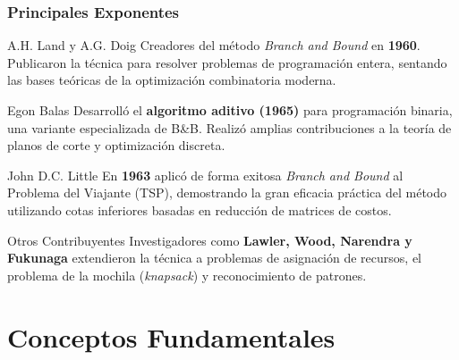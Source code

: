 \documentclass[aspectratio=169]{beamer}
\begin{document}
\begin{frame}[fragile]
    \frametitle{Principales Exponentes}
    \justifying
    
    \begin{minipage}[t]{0.48\textwidth}
        \begin{block}{A.H. Land y A.G. Doig}
            \scriptsize
            Creadores del método \emph{Branch and Bound} en \textbf{1960}. Publicaron la técnica para resolver problemas de programación entera, sentando las bases teóricas de la optimización combinatoria moderna.
        \end{block}
        
        \begin{block}{Egon Balas}
            \scriptsize
            Desarrolló el \textbf{algoritmo aditivo (1965)} para programación binaria, una variante especializada de B\&B. Realizó amplias contribuciones a la teoría de planos de corte y optimización discreta.
        \end{block}
    \end{minipage}
    \hfill
    \begin{minipage}[t]{0.48\textwidth}
        \begin{block}{John D.C. Little}
            \scriptsize
            En \textbf{1963} aplicó de forma exitosa \emph{Branch and Bound} al Problema del Viajante (TSP), demostrando la gran eficacia práctica del método utilizando cotas inferiores basadas en reducción de matrices de costos.
        \end{block}
        
        \begin{block}{Otros Contribuyentes}
            \scriptsize
            Investigadores como \textbf{Lawler, Wood, Narendra y Fukunaga} extendieron la técnica a problemas de asignación de recursos, el problema de la mochila (\emph{knapsack}) y reconocimiento de patrones.
        \end{block}
    \end{minipage}
\end{frame}

\section{Conceptos Fundamentales}
\end{document}
